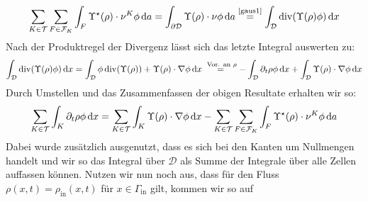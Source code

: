 \begin{align*}
	\sum_{K\in \mathcal{T}} \sum_{F \in \mathcal{F}_K} \int_F \Upsilon^{\star}(\rho) \cdot \nu^K \phi \, \mathrm{d} a = \int_{\partial \mathcal{D}} \Upsilon(\rho) \cdot \nu \phi \, \mathrm{d} a \stackrel{\text{\ref{gaus1}}}{=} \int_{\mathcal{D}} \operatorname{div} (\Upsilon(\rho)\phi) \, \mathrm{d} x
\end{align*}
Nach der Produktregel der Divergenz lässt sich das letzte Integral auswerten zu:
\begin{align*}
	 \int_{\mathcal{D}} \operatorname{div} (\Upsilon(\rho)\phi) \, \mathrm{d} x = \int_{\mathcal{D}} \phi \operatorname{div}(\Upsilon(\rho)) + \Upsilon(\rho) \cdot \nabla \phi \, \mathrm{d} x \stackrel{\text{ Vor. an }\rho }{=} - \int_{\mathcal{D}} \partial_t \rho \phi \, \mathrm{d} x + \int_{\mathcal{D}} \Upsilon(\rho) \cdot \nabla \phi \, \mathrm{d} x
\end{align*}
Durch Umstellen und das Zusammenfassen der obigen Resultate erhalten wir so: 
\begin{align*}
	\sum_{K \in \mathcal{T}} \int_K \partial_t \rho  \phi \, \mathrm{d} x = \sum_{K \in \mathcal{T}} \int_K \Upsilon(\rho ) \cdot \nabla \phi \, \mathrm{d} x - 	\sum_{K\in \mathcal{T}} \sum_{F \in \mathcal{F}_K} \int_F \Upsilon^{\star}(\rho) \cdot \nu^K \phi \, \mathrm{d} a
\end{align*}
Dabei wurde zusätzlich ausgenutzt, dass es sich bei den Kanten um Nullmengen handelt und wir so das Integral über $ \mathcal{D} $ als Summe der Integrale über alle Zellen auffassen können. Nutzen wir nun noch aus, dass für den Fluss  $\rho(x,t) = \rho_{\text{in}}(x,t)$ für $ x \in \Gamma_{\text{in}} $ gilt, kommen wir so auf 

